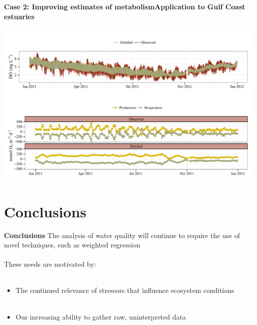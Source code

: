 \documentclass[serif]{beamer}\usepackage[]{graphicx}\usepackage[]{color}
\newenvironment{knitrout}{}{} %
\begin{document}
\begin{frame}{\textbf{Case 2: Improving estimates of metabolism}}{\textbf{Application to Gulf Coast estuaries}}
\begin{knitrout}
\color{fgcolor}

{\centering \includegraphics[width=\textwidth]{fig/dtd_met} 

}



\end{knitrout}
\end{frame}

\section{Conclusions}

\begin{frame}{\textbf{Conclusions}}
The analysis of water quality will continue to require the use of novel techniques, such as weighted regression\\~\\
These needs are motivated by: \\~\\
\begin{itemize}
\item The continued relevance of stressors that influence ecosystem conditions \\~\\
\item Our increasing ability to gather raw, uninterpreted data \\~\\
\end{itemize}
\end{frame}
\end{document}
